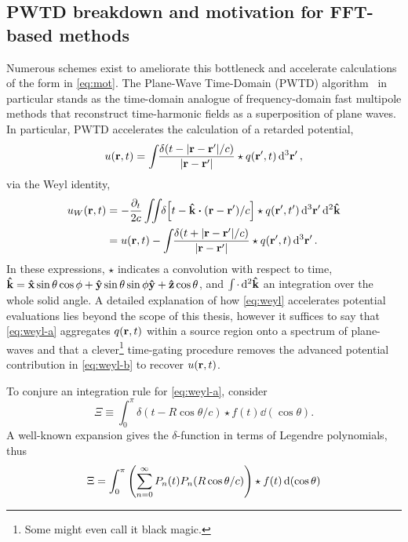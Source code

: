 \subsection{PWTD breakdown and motivation for FFT-based methods}

Numerous schemes exist to ameliorate this bottleneck and accelerate calculations of the form in \cref{eq:mot}.
The Plane-Wave Time-Domain (PWTD) algorithm~\cite{PWTD} in particular stands as the time-domain analogue of frequency-domain fast multipole methods that reconstruct time-harmonic fields as a superposition of plane waves.
In particular, PWTD accelerates the calculation of a retarded potential,
\begin{equation}
  u(\vb{r}, t) = \int_{} \kern0.1em \frac{\delta(t - \abs{\vb{r} - \vb{r}'}/c)}{\abs{\vb{r} - \vb{r}'}} \star q(\vb{r}', t) \dd[3]{\vb{r}'},
  \label{eq:retarded potential}
\end{equation}
via the Weyl identity,
\begin{subequations}
  \begin{align}
    u_W(\vb{r}, t) & = -\frac{\partial_t}{2c} \siint \delta\qty[t - \vu{k} \vdot (\vb{r} - \vb{r}')/c] \star q(\vb{r}', t') \dd[3]{\vb{r}'} \dd[2]{\vu{k}} \label{eq:weyl-a}\\
                   & = u(\vb{r}, t) - \sint \frac{\delta(t + \abs{\vb{r} - \vb{r}'}/c)}{\abs{\vb{r} - \vb{r}'}} \star q(\vb{r}', t) \dd[3]{\vb{r}'}. \label{eq:weyl-b}
  \end{align}
  \label{eq:weyl}
\end{subequations}
In these expressions, $\star$ indicates a convolution with respect to time, $\vu{k} = \vu{x} \sin \theta \cos \phi + \vu{y} \sin \theta \sin \phi \vu{y} + \vu{z} \cos \theta$, and $\int_{} \kern0.1em \cdot \dd[2]{\vu{k}}$ an integration over the whole solid angle.
A detailed explanation of how \cref{eq:weyl} accelerates potential evaluations lies beyond the scope of this thesis, however it suffices to say that \cref{eq:weyl-a} aggregates $q(\vb{r}, t)$ within a source region onto a spectrum of plane-waves and that a clever\footnote{Some might even call it black magic.} time-gating procedure removes the advanced potential contribution in \cref{eq:weyl-b} to recover $u(\vb{r}, t)$.

To conjure an integration rule for \cref{eq:weyl-a}, consider
\begin{equation}
  \Xi \equiv \int_{0}^\pi \delta(t - R \cos \theta/c) \star f(t) \dd{(\cos\theta)}.
\end{equation}
A well-known expansion gives the $\delta$-function in terms of Legendre polynomials, thus
\begin{equation}
  \Xi = \int_{0}^\pi \qty(\sum_{n=0}^{\infty} P_n(t) P_n(R\cos\theta/c)) \star f(t) \dd{(\cos\theta)}
\end{equation}
